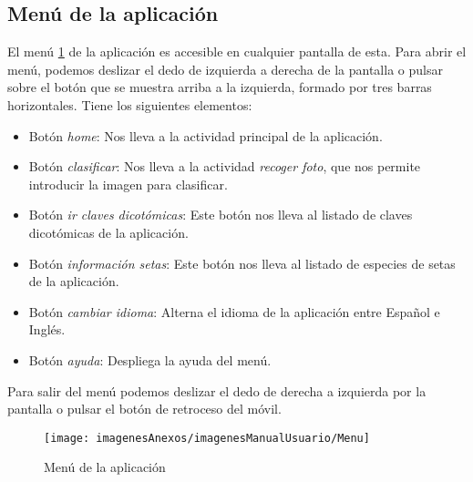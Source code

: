 \subsection{Menú de la aplicación}

El menú \ref{figMenu} de la aplicación es accesible en cualquier pantalla de esta. Para abrir el menú, podemos deslizar el dedo de izquierda a derecha de la pantalla o pulsar sobre el botón que se muestra arriba a la izquierda, formado por tres barras horizontales. Tiene los siguientes elementos:

\begin{itemize}
	\item Botón \textit{home}: Nos lleva a la actividad principal de la aplicación.
	\item Botón \textit{clasificar}: Nos lleva a la actividad \textit{recoger foto}, que nos permite introducir la imagen para clasificar.
	\item Botón \textit{ir claves dicotómicas}: Este botón nos lleva al listado de claves dicotómicas de la aplicación.
	\item Botón \textit{información setas}: Este botón nos lleva al listado de especies de setas de la aplicación.
	\item Botón \textit{cambiar idioma}: Alterna el idioma de la aplicación entre Español e Inglés.
	\item Botón \textit{ayuda}: Despliega la ayuda del menú.
\end{itemize}

Para salir del menú podemos deslizar el dedo de derecha a izquierda por la pantalla o pulsar el botón de retroceso del móvil.

\begin{figure}[h]
    \begin{center}%
        \begin{center}%
          \texttt{[image: imagenesAnexos/imagenesManualUsuario/Menu]}%
          \caption{Menú de la aplicación}%
          \label{figMenu}%
        \end{center}%
  	\end{center}%
\end{figure}%
\newpage


